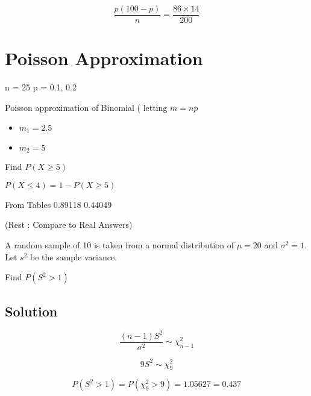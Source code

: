 \documentclass[]{report}
\begin{document}
\[ \frac{p(100-p)}{n} =\frac{86 \times 14}{200}\]









\section{Poisson Approximation}

n  = 25
p = 0.1, 0.2

Poisson approximation of Binomial ( letting $m=np$

\begin{itemize}
	\item $m_1 = 2.5$
	\item $m_2 = 5$
\end{itemize}

Find $P(X\geq 5)$ 

$ P(X\leq 4)  = 1 - P(X\geq 5) $

From Tables 
0.89118
0.44049

(Rest : Compare to Real Answers)


A random sample of 10 is taken from a normal distribution of $\mu=20$ and $\sigma^2=1$. Let $s^2$ be the sample variance.

Find $P(S^2>1)$

\subsection*{Solution}

\[ \frac{(n-1)S^2}{\sigma^2} \sim \chi^2_{n-1}\]

\[ 9S^2 \sim \chi^2_{9}\]


\[ P(S^2>1) = P(\chi^2_{9}>9) = 1.05627 = 0.437\]
\end{document}

